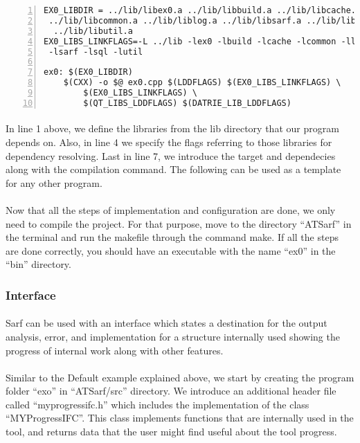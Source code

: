 \documentclass{article}
\begin{document}
\begin{Verbatim}[numbers=left]
EX0_LIBDIR = ../lib/libex0.a ../lib/libbuild.a ../lib/libcache.a
 ../lib/libcommon.a ../lib/liblog.a ../lib/libsarf.a ../lib/libsql.a
  ../lib/libutil.a
EX0_LIBS_LINKFLAGS=-L ../lib -lex0 -lbuild -lcache -lcommon -llog
 -lsarf -lsql -lutil

ex0: $(EX0_LIBDIR)
	$(CXX) -o $@ ex0.cpp $(LDDFLAGS) $(EX0_LIBS_LINKFLAGS) \
		$(EX0_LIBS_LINKFLAGS) \
		$(QT_LIBS_LDDFLAGS) $(DATRIE_LIB_LDDFLAGS)
\end{Verbatim}

\paragraph{}
In line 1 above, we define the libraries from the lib directory that our program depends on. Also, in line 4 we specify the flags referring to those libraries for dependency resolving. Last in line 7, we introduce the target and dependecies along with the compilation command. The following can be used as a template for any other program.

\paragraph{}
Now that all the steps of implementation and configuration are done, we only need to compile the project. For that purpose, move to the directory ``ATSarf'' in the terminal and run the makefile through the command make. If all the steps are done correctly, you should have an executable with the name ``ex0'' in the ``bin'' directory.

\subsubsection{Interface}
\label{subsubsec:interface}

\paragraph{}
Sarf can be used with an interface which states a destination for the output analysis, error, and implementation for a structure internally used showing the progress of internal work along with other features.

\paragraph{}
Similar to the Default example explained above, we start by creating the program folder ``exo'' in ``ATSarf/src'' directory. We introduce an additional header file called ``myprogressifc.h'' which includes the implementation of the class ``MYProgressIFC''. This class implements functions that are internally used in the tool, and returns data that the user might find useful about the tool progress.
\end{document}
